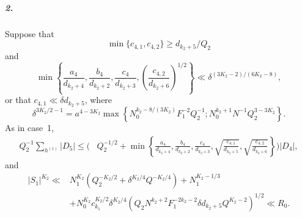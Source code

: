 \documentclass[10pt]{article}
\begin{document}
\subparagraph{2.}
Suppose that
\[
  \min\{c_{4,1},c_{4,2}\}\geqslant d_{k_2+5}/Q_2
\]
and
\[
  \min\left\{
    \frac{a_4}{d_{k_2+4}},\frac{b_4}{d_{k_2+2}},
    \frac{c_4}{d_{k_2+3}},
    \left(\frac{c_{4,2}}{d_{k_2+6}}\right)^{1/2}
  \right\}
  \ll\delta^{(3K_2-2)/(6K_2-8)},
\]
or that $c_{4,1}\ll\delta d_{k_2+5}$, where
\[
  \delta^{3K_2/2-1}
  =a^{4-3K_2}\max\left\{
    N_0^{k_2-8/(3K_2)}F_1^{-2}Q_2^{-1};
    N_0^{k_2+1}N^{-1}Q_2^{3-3K_2}
  \right\}.
\]
As in case~1,
\[
\begin{aligned}
  Q_2^{-1}\sum_{h^{(1)}}|D_5|
  \leqslant\Bigg(&Q_2^{-1/2}
  +\min\left\{
    \frac{a_4}{d_{k_2+4}},\frac{b_4}{d_{k_2+2}},
    \frac{c_4}{d_{k_2+3}},
    \sqrt{\frac{c_{4,1}}{d_{k_2+5}}},
    \sqrt{\frac{c_{4,2}}{d_{k_2+6}}}
  \right\}\Bigg)|D_4|,
\end{aligned}
\]
and
\[
\begin{aligned}
  |S_1|^{K_2}
  \ll{}&N_1^{K_2}\left(Q_2^{-K_2/2}+\delta^{K_2/4}Q^{-K_2/4}\right)
  +N_1^{K_2-1/3}\\
  &+N_0^{K_2}c_{k_1}^{K_2/2}\delta^{K_2/4}
  \left(Q_2N^{k_2+2}F_1^{-2k_2-2}\delta d_{k_2+5}Q^{K_2-2}\right)^{1/2}
  \ll R_0.
\end{aligned}
\]
\end{document}
